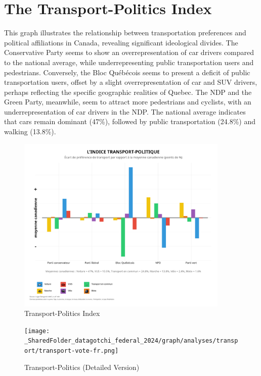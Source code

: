\documentclass[
  letterpaper,
  DIV=11,
  numbers=noendperiod]{scrartcl}
\begin{document}
\section{The Transport-Politics
Index}\label{the-transport-politics-index}

This graph illustrates the relationship between transportation
preferences and political affiliations in Canada, revealing significant
ideological divides. The Conservative Party seems to show an
overrepresentation of car drivers compared to the national average,
while underrepresenting public transportation users and pedestrians.
Conversely, the Bloc Québécois seems to present a deficit of public
transportation users, offset by a slight overrepresentation of car and
SUV drivers, perhaps reflecting the specific geographic realities of
Quebec. The NDP and the Green Party, meanwhile, seem to attract more
pedestrians and cyclists, with an underrepresentation of car drivers in
the NDP. The national average indicates that cars remain dominant
(47\%), followed by public transportation (24.8\%) and walking (13.8\%).

\begin{figure}[H]

{\centering \includegraphics[width=0.9\textwidth,height=\textheight]{img/transport_graph.png}

}

\caption{Transport-Politics Index}

\end{figure}%
\begin{figure}[H]

{\centering \texttt{[image: \_SharedFolder\_datagotchi\_federal\_2024/graph/analyses/transport/transport-vote-fr.png]}

}

\caption{Transport-Politics (Detailed Version)}

\end{figure}%
\end{document}
